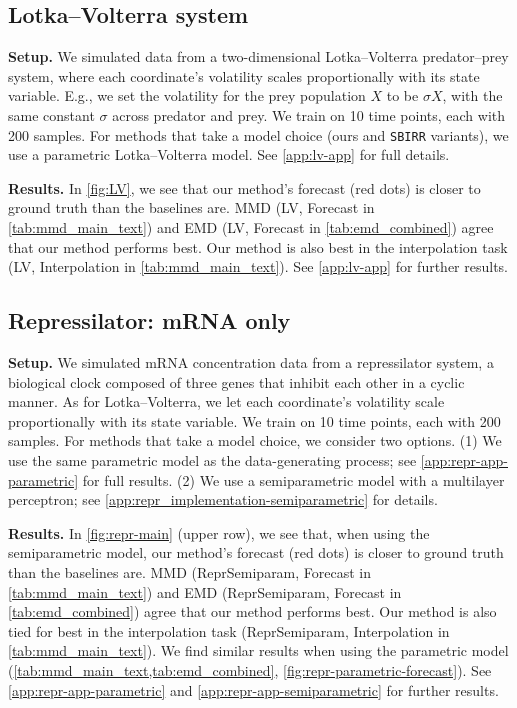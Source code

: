 \subsection{Lotka--Volterra system}
\label{sec:lv-main}

\textbf{Setup.} We simulated data from a two-dimensional Lotka–Volterra predator–prey system, where each coordinate’s volatility scales proportionally with its state variable. E.g., we set the volatility for the prey population $X$ to be $\sigma X$, with the same constant $\sigma$ across predator and prey. We train on 10 time points, each with 200 samples. For methods that take a model choice (ours and \texttt{SBIRR} variants), we use a parametric Lotka--Volterra model. See \cref{app:lv-app} for full details.


\textbf{Results.} In \cref{fig:LV}, we see that our method's forecast (red dots) is closer to ground truth than the baselines are. MMD (LV, Forecast in \cref{tab:mmd_main_text}) and EMD (LV, Forecast in \cref{tab:emd_combined}) agree that our method performs best. Our method is also best in the interpolation task (LV, Interpolation in \cref{tab:mmd_main_text}). See \cref{app:lv-app} for further results.


\subsection{Repressilator: mRNA only}
\label{sec:repr-main}
\textbf{Setup.} We simulated mRNA concentration data from a repressilator system, a biological clock composed of three genes that inhibit each other in a cyclic manner. As for Lotka--Volterra, we let each coordinate’s volatility scale proportionally with its state variable. We train on 10 time points, each with 200 samples. For methods that take a model choice, we consider two options. (1) We use the same parametric model as the data-generating process; see \cref{app:repr-app-parametric} for full results. (2) We use a semiparametric model with a multilayer perceptron; see \cref{app:repr_implementation-semiparametric} for details.


\textbf{Results.}
In \cref{fig:repr-main} (upper row), we see that, when using the semiparametric model, our method's forecast (red dots) is closer to ground truth than the baselines are. MMD (ReprSemiparam, Forecast in \cref{tab:mmd_main_text}) and EMD (ReprSemiparam, Forecast in \cref{tab:emd_combined}) agree that our method performs best. Our method is also tied for best in the interpolation task (ReprSemiparam, Interpolation in \cref{tab:mmd_main_text}). We find similar results when using the parametric model (\cref{tab:mmd_main_text,tab:emd_combined}, \cref{fig:repr-parametric-forecast}). See \cref{app:repr-app-parametric} and \cref{app:repr-app-semiparametric} for further results. 

